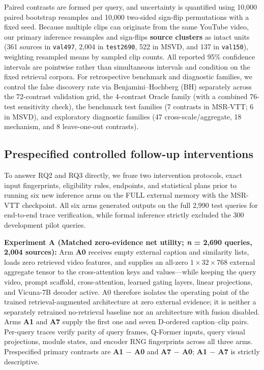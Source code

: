 \documentclass[11pt,a4paper]{article}
\begin{document}
Paired contrasts are formed per query, and uncertainty is quantified using 10,000 paired bootstrap resamples and 10,000 two-sided sign-flip permutations with a fixed seed. Because multiple clips can originate from the same YouTube video, our primary inference resamples and sign-flips \textbf{source clusters} as intact units (361 sources in \texttt{val497}, 2,004 in \texttt{test2690}, 522 in MSVD, and 137 in \texttt{val150}), weighting resampled means by sampled clip counts. All reported 95\% confidence intervals are pointwise rather than simultaneous intervals and condition on the fixed retrieval corpora. For retrospective benchmark and diagnostic families, we control the false discovery rate via Benjamini--Hochberg (BH) separately across the 72-contrast validation grid, the 4-contrast Oracle family (with a combined 76-test sensitivity check), the benchmark test families (7 contrasts in MSR-VTT; 6 in MSVD), and exploratory diagnostic families (47 cross-scale/aggregate, 18 mechanism, and 8 leave-one-out contrasts).

\subsection{Prespecified controlled follow-up interventions}
To answer RQ2 and RQ3 directly, we froze two intervention protocols, exact input fingerprints, eligibility rules, endpoints, and statistical plans prior to running six new inference arms on the FULL external memory with the MSR-VTT checkpoint. All six arms generated outputs on the full 2,990 test queries for end-to-end trace verification, while formal inference strictly excluded the 300 development pilot queries.

\textbf{Experiment A (Matched zero-evidence net utility; \emph{n} = 2,690 queries, 2,004 sources):} Arm \textbf{A0} receives empty external caption and similarity lists, loads zero retrieved video features, and supplies an all-zero $1 \times 32 \times 768$ external aggregate tensor to the cross-attention keys and values---while keeping the query video, prompt scaffold, cross-attention, learned gating layers, linear projections, and Vicuna-7B decoder active. A0 therefore isolates the operating point of the trained retrieval-augmented architecture at zero external evidence; it is neither a separately retrained no-retrieval baseline nor an architecture with fusion disabled. Arms \textbf{A1} and \textbf{A7} supply the first one and seven D-ordered caption--clip pairs. Per-query traces verify parity of query frames, Q-Former inputs, query visual projections, module states, and encoder RNG fingerprints across all three arms. Prespecified primary contrasts are \textbf{A1 $-$ A0} and \textbf{A7 $-$ A0}; \textbf{A1 $-$ A7} is strictly descriptive.
\end{document}

